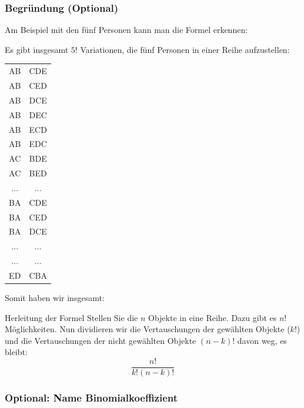 \subsubsection{Begründung (Optional)}
Am Beispiel mit den fünf Personen kann man die Formel erkennen:

Es gibt insgesamt $5!$ Variationen, die fünf Personen in einer Reihe aufzustellen:
\begin{tabular}{c|c}
  AB&CDE\\
  AB&CED\\
  AB&DCE\\
  AB&DEC\\
  AB&ECD\\
  AB&EDC\\\hline
  AC&BDE\\
  AC&BED\\
  ... & ...\\\hline
  BA&CDE\\
  BA&CED\\
  BA&DCE\\
  ...&...\\\hline
  ...&...\\\hline
  ED&CBA
\end{tabular}


\noTRAINER{\vspace{2cm}}

  Somit haben wir insgesamt:



\begin{bemerkung}{Herleitung der Formel}{}
Stellen Sie die $n$ Objekte in eine Reihe. Dazu gibt
es $n!$ Möglichkeiten. Nun dividieren wir die Vertauschungen der
gewählten Objekte ($k!$) und die Vertauschungen der nicht gewählten
Objekte $(n-k)!$ davon weg, es bleibt: $$\frac{n!}{k!(n-k)!}$$
\end{bemerkung}
\newpage

\subsubsection{Optional: Name Binomialkoeffizient}

